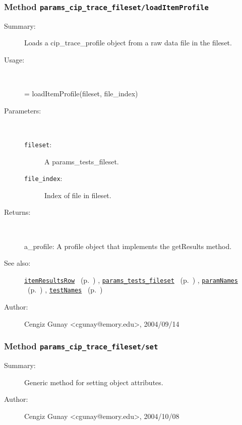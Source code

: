\subsubsection[Method \texttt{loadItemProfile}]{Method \texttt{params\_cip\_trace\_fileset/loadItemProfile}}%
%
\label{ref_params_cip_trace_fileset__loadItemProfile}%
\hypertarget{ref_params_cip_trace_fileset__loadItemProfile}{}%
\begin{description}
\item[Summary:]Loads a cip\_trace\_profile object from a raw data file in the fileset.
%
\item[Usage:]~%
\begin{lyxcode}%
[params\_row, tests\_row] = loadItemProfile(fileset, file\_index)
%
\end{lyxcode}%
%
%
\item[Parameters:]~
\begin{description}%
\item[\texttt{fileset}:]
 A params\_tests\_fileset.
\item[\texttt{file\_index}:]
 Index of file in fileset.
\end{description}%
%
\item[Returns:
]~

	a\_profile: A profile object that implements the getResults method.
%
%
\item[See also:]%
\hyperlink{ref_itemResultsRow}{\texttt{itemResultsRow}}%
\ (p.~\pageref{ref_itemResultsRow})%
%
, \hyperlink{ref_params_tests_fileset}{\texttt{params\_tests\_fileset}}%
\ (p.~\pageref{ref_params_tests_fileset})%
%
, \hyperlink{ref_paramNames}{\texttt{paramNames}}%
\ (p.~\pageref{ref_paramNames})%
%
, \hyperlink{ref_testNames}{\texttt{testNames}}%
\ (p.~\pageref{ref_testNames})%
%
%
\item[Author:]%
Cengiz Gunay <cgunay@emory.edu>, 2004/09/14
%
\end{description}
\methodline%
\subsubsection[Method \texttt{set}]{Method \texttt{params\_cip\_trace\_fileset/set}}%
%
\label{ref_params_cip_trace_fileset__set}%
\hypertarget{ref_params_cip_trace_fileset__set}{}%
\begin{description}
\item[Summary:]Generic method for setting object attributes.
%
%
%
%
%
%
%
\item[Author:]%
Cengiz Gunay <cgunay@emory.edu>, 2004/10/08
%
\end{description}
\methodline%
